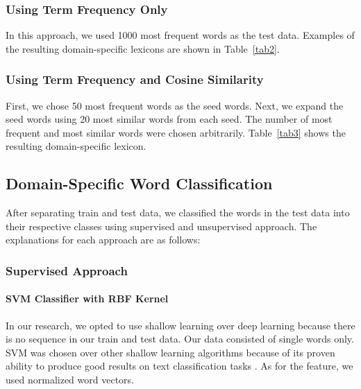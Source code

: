 \documentclass[a4paper,conference]{IEEEtran}
\begin{document}
\subsubsection{Using Term Frequency Only}
In this approach, we used 1000 most frequent words as the test data. Examples of the resulting domain-specific lexicons are shown in Table~\ref{tab2}.

\subsubsection{Using Term Frequency and Cosine Similarity}
First, we chose 50 most frequent words as the seed words. Next, we expand the seed words using 20 most similar words from each seed. The number of most frequent and most similar words were chosen arbitrarily. Table~\ref{tab3} shows the resulting domain-specific lexicon.

\subsection{Domain-Specific Word Classification}
After separating train and test data, we classified the words in the test data into their respective classes using supervised and unsupervised approach. The explanations for each approach are as follows:

\subsubsection{Supervised Approach}
\paragraph{SVM Classifier with RBF Kernel}
In our research, we opted to use shallow learning over deep learning because there is no sequence in our train and test data. Our data consisted of single words only. SVM was chosen over other shallow learning algorithms because of its proven ability to produce good results on text classification tasks \cite{b15}.  As for the feature, we used normalized word vectors.
\end{document}
